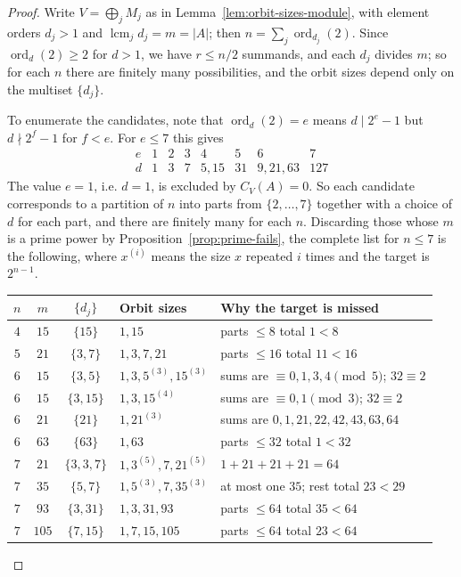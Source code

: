\documentclass[11pt,a4paper,reqno]{amsart}
\theoremstyle{definition}
\theoremstyle{remark}
\begin{document}
\begin{proof}
Write $V=\bigoplus_jM_j$ as in Lemma~\ref{lem:orbit-sizes-module}, with
element orders $d_j>1$ and $\operatorname{lcm}_jd_j=m=|A|$; then
$n=\sum_j\operatorname{ord}_{d_j}(2)$.  Since
$\operatorname{ord}_{d}(2)\ge2$ for $d>1$, we have $r\le n/2$
summands, and each $d_j$ divides $m$; so for each $n$ there are
finitely many possibilities, and the orbit sizes depend only on the
multiset $\{d_j\}$.

To enumerate the candidates, note that $\operatorname{ord}_d(2)=e$ means
$d\mid2^e-1$ but $d\nmid2^f-1$ for $f<e$.  For $e\le7$ this gives
\[
 \begin{array}{c|ccccccc}
 e&1&2&3&4&5&6&7\\\hline
 d&1&3&7&5,15&31&9,21,63&127
 \end{array}
\]
The value $e=1$, i.e. $d=1$, is excluded by $C_V(A)=0$.  So each
candidate corresponds to a partition of $n$ into parts from
$\{2,\dots,7\}$ together with a choice of $d$ for each part, and there
are finitely many for each $n$.  Discarding those whose $m$ is a prime
power by Proposition~\ref{prop:prime-fails}, the complete list for
$n\le7$ is the
following, where $x^{(i)}$ means the size $x$ repeated $i$ times and the
target is $2^{n-1}$.

\begin{center}
\begin{tabular}{@{}cccll@{}}
\toprule
$n$ & $m$ & $\{d_j\}$ & Orbit sizes & Why the target is missed\\
\midrule
$4$ & $15$ & $\{15\}$ & $1,15$ & parts $\le8$ total $1<8$\\
$5$ & $21$ & $\{3,7\}$ & $1,3,7,21$ & parts $\le16$ total $11<16$\\
$6$ & $15$ & $\{3,5\}$ & $1,3,5^{(3)},15^{(3)}$
 & sums are $\equiv0,1,3,4\pmod5$; $32\equiv2$\\
$6$ & $15$ & $\{3,15\}$ & $1,3,15^{(4)}$
 & sums are $\equiv0,1\pmod3$; $32\equiv2$\\
$6$ & $21$ & $\{21\}$ & $1,21^{(3)}$
 & sums are $0,1,21,22,42,43,63,64$\\
$6$ & $63$ & $\{63\}$ & $1,63$ & parts $\le32$ total $1<32$\\
$7$ & $21$ & $\{3,3,7\}$ & $1,3^{(5)},7,21^{(5)}$
 & \textbf{$1+21+21+21=64$}\\
$7$ & $35$ & $\{5,7\}$ & $1,5^{(3)},7,35^{(3)}$
 & at most one $35$; rest total $23<29$\\
$7$ & $93$ & $\{3,31\}$ & $1,3,31,93$
 & parts $\le64$ total $35<64$\\
$7$ & $105$ & $\{7,15\}$ & $1,7,15,105$
 & parts $\le64$ total $23<64$\\
\bottomrule
\end{tabular}
\end{center}


\end{proof}
\end{document}
